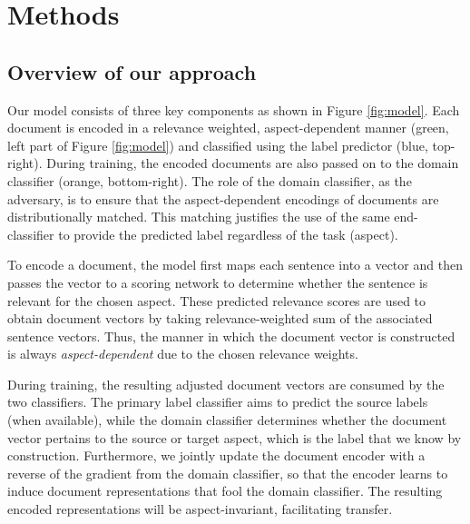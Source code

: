 \section{Methods}


\subsection{Overview of our approach}


Our model consists of three key components as shown in Figure \ref{fig:model}. Each document is encoded in a relevance weighted, aspect-dependent manner (green, left part of Figure \ref{fig:model}) and classified using the label predictor (blue, top-right). During training, the encoded documents are also passed on to the domain classifier (orange, bottom-right). The role of the domain classifier, as the adversary, is to ensure that the aspect-dependent encodings of documents are distributionally matched. This matching justifies the use of the same end-classifier to provide the predicted label regardless of the task (aspect).  

To encode a document, the model first maps each sentence into a vector and then passes the vector to a scoring network to determine whether the sentence is relevant for the chosen aspect. These predicted relevance scores are used to obtain document vectors by taking relevance-weighted sum of the associated sentence vectors. Thus, the manner in which the document vector is constructed is always \emph{aspect-dependent} due to the chosen relevance weights.

During training, the resulting adjusted document vectors are consumed by the two classifiers. The primary label classifier aims to predict the source labels (when available), while the domain classifier determines whether the document vector pertains to the source or target aspect, which is the label that we know by construction. Furthermore, we jointly update the document encoder with a reverse of the gradient from the domain classifier, so that the encoder learns to induce document representations that fool the domain classifier. The resulting encoded representations will be aspect-invariant, facilitating transfer. 

